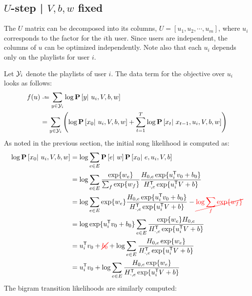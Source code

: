 \documentclass{article}
\newcommand{\ccancel}[2][black]{\color{#1}\cancel{#2}\normalcolor}
\begin{document}
\subsection{$U$-step | $V, b, w$ fixed}
The $U$ matrix can be decomposed into its columns, $U = [u_1, u_2, \cdots, u_m]$, where $u_i$ corresponds to the factor for the $i$th user.
Since users are independent, the columns of $u$ can be optimized independently.  Note also that each $u_i$ depends only on the playlists for user $i$.

Let $\mathcal{Y}_i$ denote the playlists of user $i$. The data term for the objective over $u_i$ looks as follows:
\begin{align*}
f(u) &\defeq \sum_{y \in \Y_i} \log\P\left[y\given u_i, V, b, w\right]\\
&= \sum_{y \in \Y_i}\left( \log \P\left[x_0 \given u_i, V, b, w \right] + \sum_{t=1}^T \log \P\left[x_t \given x_{t-1}, u_i, V, b, w \right] \right)
\end{align*}
As noted in the previous section, the initial song likelihood is computed as:
\begin{align*}
\log\P\left[x_0 \given u_i, V, b, w\right] &= \log\sum_{e\in E} \P\left[e\given w\right]\P\left[x_0 \given e, u_i, V, b \right] \\
&= \log\sum_{e\in E} \frac{\exp\{ w_e\}}{\sum_f \exp\{w_f\}} \frac{H_{0, e} \exp\{u_i\trans v_0 + b_0 \} }{H_{\cdot, e}\trans \exp\{u_i\trans V + b \} }\\
&= \log\sum_{e\in E} \exp\{ w_e\} \frac{H_{0, e} \exp\{u_i\trans v_0 + b_0 \} }{H_{\cdot, e}\trans \exp\{u_i\trans V + b \} } - \ccancel[red]{\log\sum_f \exp\{w_f\}}\\
&= \log \exp\{u_i\trans v_0 + b_0 \} \sum_{e \in E} \frac{\exp\{ w_e \} H_{0, e} }{H_{\cdot, e}\trans \exp\{u_i\trans V + b \} }\\
&= u_i\trans v_0 + \ccancel[red]{b_0} + \log \sum_{e\in E}\frac{ H_{0, e}\exp\{w_e\}}{H_{\cdot, e}\trans \exp\{u_i\trans V + b \}}\\
&= u_i\trans v_0 + \log \sum_{e\in E}\frac{ H_{0, e}\exp\{w_e\}}{H_{\cdot, e}\trans \exp\{u_i\trans V + b \}}
\end{align*}
The bigram transition likelihoods are similarly computed:
\end{document}
